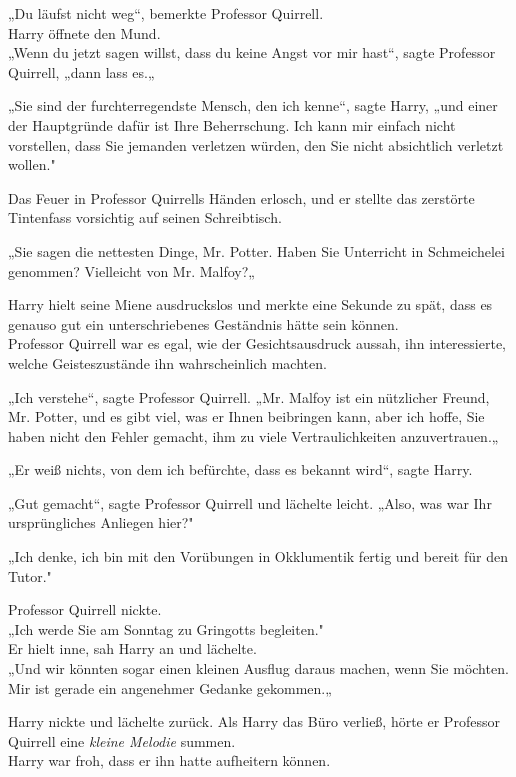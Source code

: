 {„Du läufst nicht weg“, bemerkte Professor Quirrell.\\ Harry öffnete den Mund.\\ „Wenn du jetzt sagen willst, dass du keine Angst vor mir hast“, sagte Professor Quirrell, „dann lass es.„

„Sie sind der furchterregendste Mensch, den ich kenne“, sagte Harry, „und einer der Hauptgründe dafür ist Ihre Beherrschung. Ich kann mir einfach nicht vorstellen, dass Sie jemanden verletzen würden, den Sie nicht absichtlich verletzt wollen."

Das Feuer in Professor Quirrells Händen erlosch, und er stellte das zerstörte Tintenfass vorsichtig auf seinen Schreibtisch.

„Sie sagen die nettesten Dinge, Mr. Potter. Haben Sie Unterricht in Schmeichelei genommen? Vielleicht von Mr. Malfoy?„

Harry hielt seine Miene ausdruckslos und merkte eine Sekunde zu spät, dass es genauso gut ein unterschriebenes Geständnis hätte sein können.\\ Professor Quirrell war es egal, wie der Gesichtsausdruck aussah, ihn interessierte, welche Geisteszustände ihn wahrscheinlich machten.

„Ich verstehe“, sagte Professor Quirrell. „Mr. Malfoy ist ein nützlicher Freund, Mr. Potter, und es gibt viel, was er Ihnen beibringen kann, aber ich hoffe, Sie haben nicht den Fehler gemacht, ihm zu viele Vertraulichkeiten anzuvertrauen.„

„Er weiß nichts, von dem ich befürchte, dass es bekannt wird“, sagte Harry.

„Gut gemacht“, sagte Professor Quirrell und lächelte leicht. „Also, was war Ihr ursprüngliches Anliegen hier?"

„Ich denke, ich bin mit den Vorübungen in Okklumentik fertig und bereit für den Tutor."

Professor Quirrell nickte.\\ „Ich werde Sie am Sonntag zu Gringotts begleiten."\\ Er hielt inne, sah Harry an und lächelte.\\ „Und wir könnten sogar einen kleinen Ausflug daraus machen, wenn Sie möchten. Mir ist gerade ein angenehmer Gedanke gekommen.„

Harry nickte und lächelte zurück. Als Harry das Büro verließ, hörte er Professor Quirrell eine \emph{kleine Melodie} summen.\\ Harry war froh, dass er ihn hatte aufheitern können.

}
